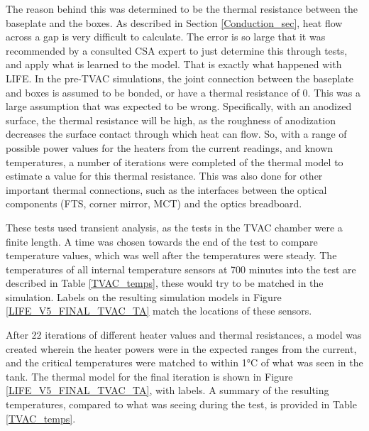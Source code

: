 The reason behind this was determined to be the thermal resistance between the baseplate and the boxes. As described in Section \ref{Conduction_sec}, heat flow across a gap is very difficult to calculate. The error is so large that it was recommended by a consulted CSA expert to just determine this through tests, and apply what is learned to the model. That is exactly what happened with LIFE. In the pre-TVAC simulations, the joint connection between the baseplate and boxes is assumed to be bonded, or have a thermal resistance of 0. This was a large assumption that was expected to be wrong. Specifically, with an anodized surface, the thermal resistance will be high, as the roughness of anodization decreases the surface contact through which heat can flow. So, with a range of possible power values for the heaters from the current readings, and known temperatures, a number of iterations were completed of the thermal model to estimate a value for this thermal resistance. This was also done for other important thermal connections, such as the interfaces between the optical components (FTS, corner mirror, MCT) and the optics breadboard.

These tests used transient analysis, as the tests in the TVAC chamber were a finite length. A time was chosen towards the end of the test to compare temperature values, which was well after the temperatures were steady. The temperatures of all internal temperature sensors at 700 minutes into the test are described in Table \ref{TVAC_temps}, these would try to be matched in the simulation. Labels on the resulting simulation models in Figure \ref{LIFE_V5_FINAL_TVAC_TA} match the locations of these sensors.

After 22 iterations of different heater values and thermal resistances, a model was created wherein the heater powers were in the expected ranges from the current, and the critical temperatures were matched to within 1°C of what was seen in the tank. The thermal model for the final iteration is shown in Figure \ref{LIFE_V5_FINAL_TVAC_TA}, with labels. A summary of the resulting temperatures, compared to what was seeing during the test, is provided in Table \ref{TVAC_temps}.

